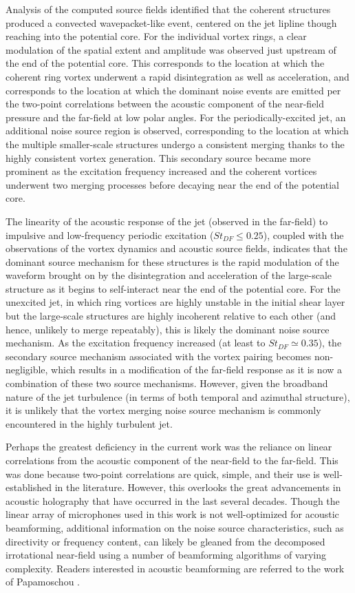 Analysis of the computed source fields identified that the coherent structures produced a convected wavepacket-like event, centered on the jet lipline though reaching into the potential core.
For the individual vortex rings, a clear modulation of the spatial extent and amplitude was observed just upstream of the end of the potential core.
This corresponds to the location at which the coherent ring vortex underwent a rapid disintegration as well as acceleration, and corresponds to the location at which the dominant noise events are emitted per the two-point correlations between the acoustic component of the near-field pressure and the far-field at low polar angles.
For the periodically-excited jet, an additional noise source region is observed, corresponding to the location at which the multiple smaller-scale structures undergo a consistent merging thanks to the highly consistent vortex generation.
This secondary source became more prominent as the excitation frequency increased and the coherent vortices underwent two merging processes before decaying near the end of the potential core.

The linearity of the acoustic response of the jet (observed in the far-field) to impulsive and low-frequency periodic excitation ($St_{DF} \leq 0.25$), coupled with the observations of the vortex dynamics and acoustic source fields, indicates that the dominant source mechanism for these structures is the rapid modulation of the waveform brought on by the disintegration and acceleration of the large-scale structure as it begins to self-interact near the end of the potential core.
For the unexcited jet, in which ring vortices are highly unstable in the initial shear layer but the large-scale structures are highly incoherent relative to each other (and hence, unlikely to merge repeatably), this is likely the dominant noise source mechanism. 
As the excitation frequency increased (at least to $St_{DF} \simeq 0.35$), the secondary source mechanism associated with the vortex pairing becomes non-negligible, which results in a modification of the far-field response as it is now a combination of these two source mechanisms.
However, given the broadband nature of the jet turbulence (in terms of both temporal and azimuthal structure), it is unlikely that the vortex merging noise source mechanism is commonly encountered in the highly turbulent jet.

Perhaps the greatest deficiency in the current work was the reliance on linear correlations from the acoustic component of the near-field to the far-field.
This was done because two-point correlations are quick, simple, and their use is well-established in the literature.
However, this overlooks the great advancements in acoustic holography that have occurred in the last several decades.
Though the linear array of microphones used in this work is not well-optimized for acoustic beamforming, additional information on the noise source characteristics, such as directivity or frequency content, can likely be gleaned from the decomposed irrotational near-field using a number of beamforming algorithms of varying complexity.
Readers interested in acoustic beamforming are referred to the work of Papamoschou \citep{Papamoschou2011}.

